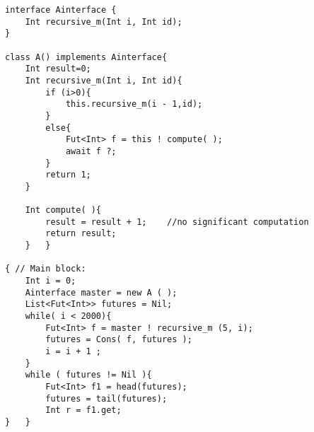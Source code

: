 %
\begin{lstlisting}[caption= ABS Example, label=absex]
interface Ainterface {
	Int recursive_m(Int i, Int id);
}

class A() implements Ainterface{
	Int result=0;
	Int recursive_m(Int i, Int id){
		if (i>0){
			this.recursive_m(i - 1,id);	
		}
		else{
			Fut<Int> f = this ! compute( );
			await f ?;
		}
		return 1;
	}
	
	Int compute( ){
		result = result + 1;	//no significant computation
		return result;
	}	}

{ // Main block:
	Int i = 0;	
	Ainterface master = new A ( );
	List<Fut<Int>> futures = Nil;	
	while( i < 2000){		
		Fut<Int> f = master ! recursive_m (5, i);
		futures = Cons( f, futures );
		i = i + 1 ;
	}
	while ( futures != Nil ){
		Fut<Int> f1 = head(futures);
		futures = tail(futures);
		Int r = f1.get;
}	}
\end{lstlisting}



